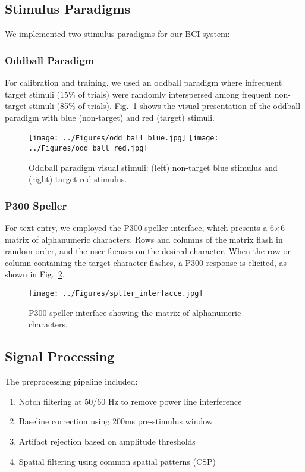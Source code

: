 \documentclass[conference]{IEEEtran}
\begin{document}
\subsection{Stimulus Paradigms}

We implemented two stimulus paradigms for our BCI system:

\subsubsection{Oddball Paradigm}
For calibration and training, we used an oddball paradigm where infrequent target stimuli (15\% of trials) were randomly interspersed among frequent non-target stimuli (85\% of trials). Fig.~\ref{fig:oddball} shows the visual presentation of the oddball paradigm with blue (non-target) and red (target) stimuli.

\begin{figure}[htbp]
\centerline{\texttt{[image: ../Figures/odd\_ball\_blue.jpg]}
\hfil
\texttt{[image: ../Figures/odd\_ball\_red.jpg]}}
\caption{Oddball paradigm visual stimuli: (left) non-target blue stimulus and (right) target red stimulus.}
\label{fig:oddball}
\end{figure}

\subsubsection{P300 Speller}
For text entry, we employed the P300 speller interface, which presents a 6×6 matrix of alphanumeric characters. Rows and columns of the matrix flash in random order, and the user focuses on the desired character. When the row or column containing the target character flashes, a P300 response is elicited, as shown in Fig.~\ref{fig:speller}.

\begin{figure}[htbp]
\centerline{\texttt{[image: ../Figures/spller\_interfacce.jpg]}}
\caption{P300 speller interface showing the matrix of alphanumeric characters.}
\label{fig:speller}
\end{figure}

\subsection{Signal Processing}
The preprocessing pipeline included:
\begin{enumerate}
\item Notch filtering at 50/60 Hz to remove power line interference
\item Baseline correction using 200ms pre-stimulus window
\item Artifact rejection based on amplitude thresholds
\item Spatial filtering using common spatial patterns (CSP)
\end{enumerate}
\end{document}
